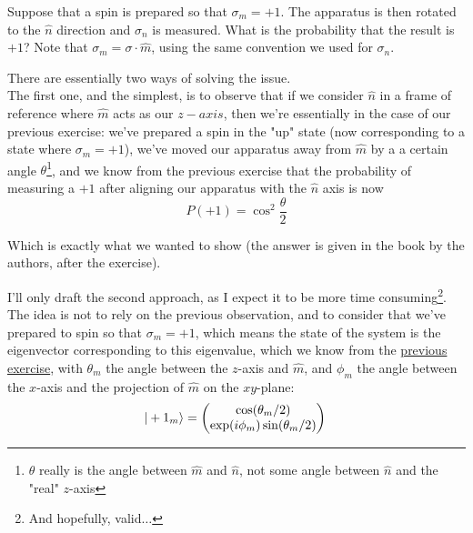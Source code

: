 \documentclass[solutions.tex]{subfiles}
\begin{document}
\maketitle
\begin{exercise} Suppose that a spin is prepared so that
$\sigma_m = +1$. The apparatus is then rotated to the $\hat{n}$
direction and $\sigma_n$ is measured. What is the probability
that the result is $+1$? Note that $\sigma_m = \sigma\cdot\hat{m}$,
using the same convention we used for $\sigma_n$.
\end{exercise}

There are essentially two ways of solving the issue. \\

The first one, and the simplest, is to observe that if we consider
$\hat{n}$ in a frame of reference where $\hat{m}$ acts as our $z-axis$,
then we're essentially in the case of our previous exercise: we've
prepared a spin in the "up" state (now corresponding to a state where
$\sigma_m = +1$), we've moved our apparatus away from $\hat{m}$ by
a a certain angle $\theta$\footnote{$\theta$ really is the angle
between $\hat{m}$ and $\hat{n}$, not some angle between $\hat{n}$ and
the "real" $z$-axis}, and we know from the previous exercise
that the probability of measuring a $+1$ after aligning our apparatus
with the $\hat{n}$ axis is now
\[
	\boxed{P(+1) = \cos^2\frac\theta2}
\]

Which is exactly what we wanted to show (the answer is given in the book
by the authors, after the exercise). \\

\hrr

I'll only draft the second approach, as I expect it to be more time
consuming\footnote{And hopefully, valid$\ldots$}. The idea is not
to rely on the previous observation, and to consider that we've
prepared to spin so that $\sigma_m = +1$, which means the state
of the system is the eigenvector corresponding to this eigenvalue,
which we know from the
\href{https://github.com/mbivert/ttm/blob/master/qm/L03E04.pdf}{previous exercise},
with $\theta_m$ the angle between the $z$-axis and $\hat{m}$, and $\phi_m$ the
angle between the $x$-axis and the projection of $\hat{m}$ on the $xy$-plane:
\[
	|+1_m\rangle = \begin{pmatrix}
		\cos(\theta_m/2) \\
		\exp(i\phi_m)\sin(\theta_m/2) \\
	\end{pmatrix} \\
\]
\end{document}
